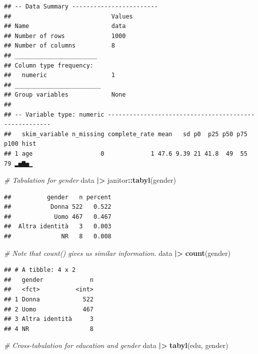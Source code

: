 \documentclass[
]{book}
\newenvironment{Shaded}{\begin{snugshade}}{\end{snugshade}}
\newcommand{\CommentTok}[1]{\textcolor[rgb]{0.56,0.35,0.01}{\textit{#1}}}
\newcommand{\FunctionTok}[1]{\textcolor[rgb]{0.13,0.29,0.53}{\textbf{#1}}}
\newcommand{\NormalTok}[1]{#1}
\newcommand{\SpecialCharTok}[1]{\textcolor[rgb]{0.81,0.36,0.00}{\textbf{#1}}}
\begin{document}
\begin{verbatim}
## -- Data Summary ------------------------
##                            Values
## Name                       data  
## Number of rows             1000  
## Number of columns          8     
## _______________________          
## Column type frequency:           
##   numeric                  1     
## ________________________         
## Group variables            None  
## 
## -- Variable type: numeric ------------------------------------------------------
##   skim_variable n_missing complete_rate mean   sd p0  p25 p50 p75 p100 hist 
## 1 age                   0             1 47.6 9.39 21 41.8  49  55   79 ▂▅▇▅▁
\end{verbatim}

\begin{Shaded}
\begin{Highlighting}[]
\CommentTok{\# Tabulation for gender}
\NormalTok{data }\SpecialCharTok{|\textgreater{}} 
\NormalTok{  janitor}\SpecialCharTok{::}\FunctionTok{tabyl}\NormalTok{(gender)}
\end{Highlighting}
\end{Shaded}

\begin{verbatim}
##          gender   n percent
##           Donna 522   0.522
##            Uomo 467   0.467
##  Altra identità   3   0.003
##              NR   8   0.008
\end{verbatim}

\begin{Shaded}
\begin{Highlighting}[]
\CommentTok{\# Note that count() gives us similar information.}
\NormalTok{data }\SpecialCharTok{|\textgreater{}} 
  \FunctionTok{count}\NormalTok{(gender)}
\end{Highlighting}
\end{Shaded}

\begin{verbatim}
## # A tibble: 4 x 2
##   gender             n
##   <fct>          <int>
## 1 Donna            522
## 2 Uomo             467
## 3 Altra identità     3
## 4 NR                 8
\end{verbatim}

\begin{Shaded}
\begin{Highlighting}[]
\CommentTok{\# Cross{-}tabulation for education and gender}
\NormalTok{data }\SpecialCharTok{|\textgreater{}} 
  \FunctionTok{tabyl}\NormalTok{(edu, gender)}
\end{Highlighting}
\end{Shaded}
\end{document}
